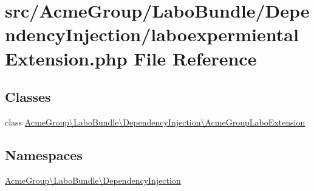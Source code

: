 \hypertarget{laboexpermiental_extension_8php}{\section{src/\+Acme\+Group/\+Labo\+Bundle/\+Dependency\+Injection/laboexpermiental\+Extension.php File Reference}
\label{laboexpermiental_extension_8php}
}
\subsection*{Classes}
\begin{DoxyCompactItemize}
\item 
class \hyperlink{class_acme_group_1_1_labo_bundle_1_1_dependency_injection_1_1_acme_group_labo_extension}{Acme\+Group\textbackslash{}\+Labo\+Bundle\textbackslash{}\+Dependency\+Injection\textbackslash{}\+Acme\+Group\+Labo\+Extension}
\end{DoxyCompactItemize}
\subsection*{Namespaces}
\begin{DoxyCompactItemize}
\item 
 \hyperlink{namespace_acme_group_1_1_labo_bundle_1_1_dependency_injection}{Acme\+Group\textbackslash{}\+Labo\+Bundle\textbackslash{}\+Dependency\+Injection}
\end{DoxyCompactItemize}
